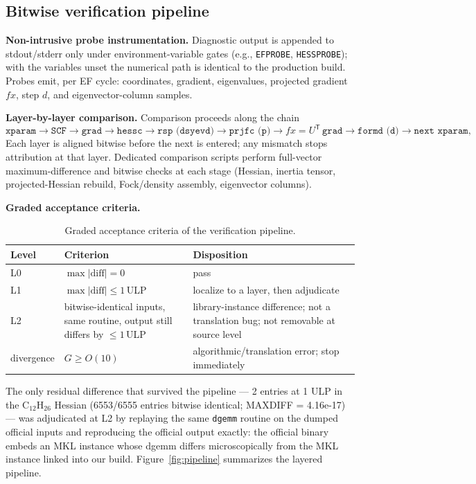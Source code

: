 \documentclass[preprint,12pt]{elsarticle}
\begin{document}
\subsection{Bitwise verification pipeline}\label{sec:method-pipeline}

\textbf{Non-intrusive probe instrumentation.} Diagnostic output is appended to stdout/stderr only under environment-variable gates (e.g., \texttt{EFPROBE}, \texttt{HESSPROBE}); with the variables unset the numerical path is identical to the production build. Probes emit, per EF cycle: coordinates, gradient, eigenvalues, projected gradient $fx$, step $d$, and eigenvector-column samples.

\textbf{Layer-by-layer comparison.} Comparison proceeds along the chain
\[
\texttt{xparam} \to \texttt{SCF} \to \texttt{grad} \to \texttt{hessc} \to \texttt{rsp (dsyevd)} \to \texttt{prjfc (p)} \to fx = U^{\mathsf T}\,\texttt{grad} \to \texttt{formd (d)} \to \texttt{next xparam},
\]
Each layer is aligned bitwise before the next is entered; any mismatch stops attribution at that layer. Dedicated comparison scripts perform full-vector maximum-difference and bitwise checks at each stage (Hessian, inertia tensor, projected-Hessian rebuild, Fock/density assembly, eigenvector columns).

\textbf{Graded acceptance criteria.}
\begin{table}[h]
\centering
\caption{Graded acceptance criteria of the verification pipeline.}\label{tab:accept}
\begin{tabular}{lll}
\toprule
Level & Criterion & Disposition \\
\midrule
L0 & $\max|\mathrm{diff}| = 0$ & pass \\
L1 & $\max|\mathrm{diff}| \le 1$\,ULP & localize to a layer, then adjudicate \\
L2 & bitwise-identical inputs, same routine, output still differs by $\le 1$\,ULP & library-instance difference; not a translation bug; not removable at source level \\
divergence & $G \ge O(10)$ & algorithmic/translation error; stop immediately \\
\bottomrule
\end{tabular}
\end{table}

The only residual difference that survived the pipeline --- 2 entries at 1 ULP in the C$_{12}$H$_{26}$ Hessian (6553/6555 entries bitwise identical; MAXDIFF = 4.16e-17) --- was adjudicated at L2 by replaying the same \texttt{dgemm} routine \cite{dongarra1990} on the dumped official inputs and reproducing the official output exactly: the official binary embeds an MKL instance whose dgemm differs microscopically from the MKL instance linked into our build. Figure~\ref{fig:pipeline} summarizes the layered pipeline.
\end{document}
